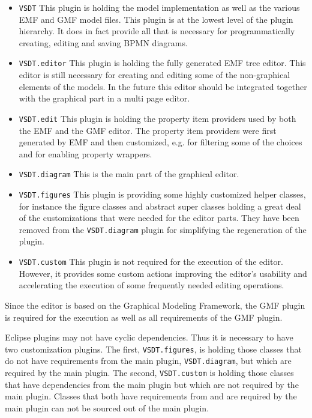 \begin{itemize}
	\item \texttt{VSDT} This plugin is holding the model implementation as well as the various EMF and GMF model files. This plugin is at the lowest level of the plugin hierarchy. It does in fact provide all that is necessary for programmatically creating, editing and saving BPMN diagrams.
	\item \texttt{VSDT.editor} This plugin is holding the fully generated EMF tree editor. This editor is still necessary for creating and editing some of the non-graphical elements of the models. In the future this editor should be integrated together with the graphical part in a multi page editor.
	\item \texttt{VSDT.edit} This plugin is holding the property item providers used by both the EMF and the GMF editor. The property item providers were first generated by EMF and then customized, e.g. for filtering some of the choices and for enabling property wrappers.
	\item \texttt{VSDT.diagram} This is the main part of the graphical editor.
	\item \texttt{VSDT.figures} This plugin is providing some highly customized helper classes, for instance the figure classes and abstract super classes holding a great deal of the customizations that were needed for the editor parts. They have been removed from the \verb|VSDT.diagram| plugin for simplifying the regeneration of the plugin.
	\item \texttt{VSDT.custom} This plugin is not required for the execution of the editor. However, it provides some custom actions improving the editor's usability and accelerating the execution of some frequently needed editing operations.
\end{itemize}

Since the editor is based on the Graphical Modeling Framework, the GMF plugin is required for the execution as well as all requirements of the GMF plugin.

Eclipse plugins may not have cyclic dependencies. Thus it is necessary to have two customization plugins. The first, \verb|VSDT.figures|, is holding those classes that do not have requirements from the main plugin, \verb|VSDT.diagram|, but which are required by the main plugin. The second, \verb|VSDT.custom| is holding those classes that have dependencies from the main plugin but which are not required by the main plugin. Classes that both have requirements from and are required by the main plugin can not be sourced out of the main plugin.

